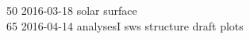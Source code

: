 \begin{footnotesize}
50	2016-03-18	solar surface\\
65	2016-04-14	analysesI sws structure draft plots\\

\end{footnotesize}
